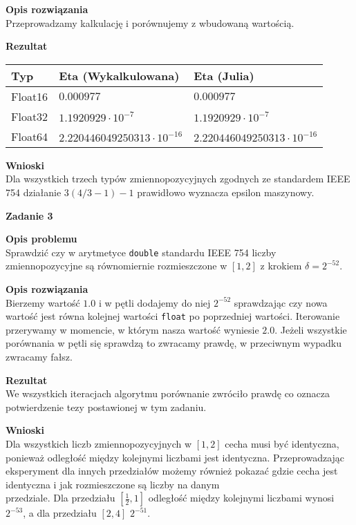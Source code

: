 \documentclass{article}
\begin{document}
\noindent \textbf{Opis rozwiązania} \\
Przeprowadzamy kalkulację i porównujemy z wbudowaną wartością.

\noindent \textbf{Rezultat}

\begin{center}
	\begin{tabular}{|l|l|l|}
		\hline
		\textbf{Typ} & \textbf{Eta (Wykalkulowana)}     & \textbf{Eta (Julia)}             \\
		\hline
		Float16      & $0.000977$                       & $0.000977$                       \\
		\hline
		Float32      & $1.1920929\cdot10^{-7}$          & $1.1920929\cdot10^{-7}$          \\
		\hline
		Float64      & $2.220446049250313\cdot10^{-16}$ & $2.220446049250313\cdot10^{-16}$ \\
		\hline
	\end{tabular}
\end{center}

\noindent \textbf{Wnioski} \\
Dla wszystkich trzech typów zmiennopozycyjnych zgodnych ze standardem IEEE 754
działanie $3(4/3 - 1) - 1$ prawidłowo wyznacza epsilon maszynowy.

\noindent \textbf{\large Zadanie 3}

\noindent \textbf{Opis problemu} \\
Sprawdzić czy w arytmetyce \texttt{double} standardu IEEE 754 liczby zmiennopozycyjne są
równomiernie rozmieszczone w $[1,2]$ z krokiem $\delta=2^{-52}$.

\noindent \textbf{Opis rozwiązania} \\
Bierzemy wartość $1.0$ i w pętli dodajemy do niej $2^{-52}$ sprawdzając
czy nowa wartość jest równa kolejnej wartości \texttt{float} po poprzedniej wartości.
Iterowanie przerywamy w momencie, w którym nasza wartość wyniesie $2.0$. Jeżeli
wszystkie porównania w pętli się sprawdzą to zwracamy prawdę, w przeciwnym wypadku
zwracamy fałsz.

\noindent \textbf{Rezultat} \\
We wszystkich iteracjach algorytmu porównanie zwróciło prawdę co oznacza potwierdzenie
tezy postawionej w tym zadaniu.

\noindent \textbf{Wnioski} \\
Dla wszystkich liczb zmiennopozycyjnych w $[1,2]$ cecha musi być identyczna, ponieważ
odległość między kolejnymi liczbami jest identyczna. Przeprowadzając eksperyment dla innych
przedziałów możemy również pokazać gdzie cecha jest identyczna i jak rozmieszczone
są liczby na danym \\ przedziale. Dla przedziału $[\frac{1}{2}, 1]$ odległość między
kolejnymi liczbami wynosi $2^{-53}$, a dla przedziału $[2, 4]$ $2^{-51}$.
\end{document}
